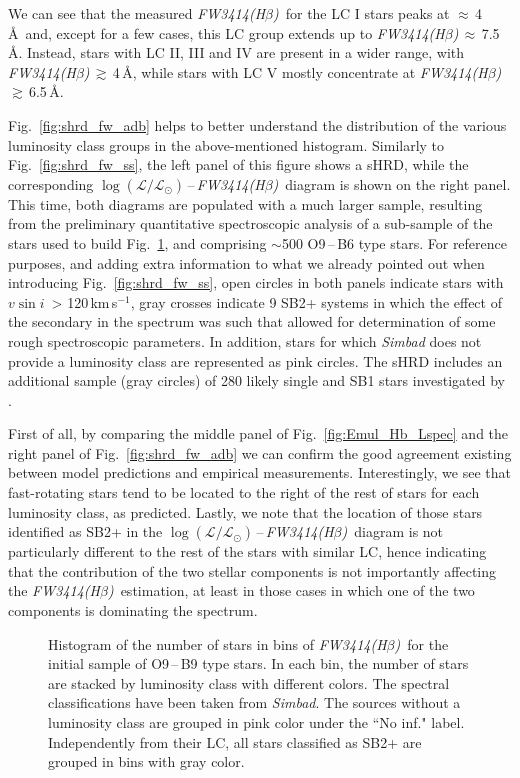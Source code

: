 \documentclass{aa}
\newcommand{\kms}{\mbox{km\,s$^{-1}$}}
\newcommand{\vsini}{\mbox{$v\sin i$}}
\newcommand{\logLs}{$\log (\mathcal{L}/\mathcal{L}_{\odot})$}
\newcommand{\gs}{\mbox{$\gtrsim$}}
\newcommand{\fwhb}{\textit{FW3414(H$\beta$)}}
\begin{document}
We can see that the measured \fwhb\ for the LC I stars peaks at $\approx$\,4\,\AA\ and, except for a few cases, this LC group extends up to \fwhb\,$\approx$\,7.5\,\AA. Instead, stars with LC II, III and IV are present in a wider range, with \fwhb\,\gs\,4\,\AA, while stars with LC V mostly concentrate at \fwhb\,\gs\,6.5\,\AA.

Fig.~\ref{fig:shrd_fw_adb} helps to better understand the distribution of the various luminosity class groups in the above-mentioned histogram. Similarly to Fig.~\ref{fig:shrd_fw_ss}, the left panel of this figure shows a sHRD, while the corresponding \logLs\,--\,\fwhb\ diagram is shown on the right panel. This time, both diagrams are populated with a much larger sample, resulting from the preliminary quantitative spectroscopic analysis of a sub-sample of the stars used to build Fig.~\ref{fig:hist_fw}, and comprising $\sim$500 O9\,--\,B6 type stars. For reference purposes, and adding extra information to what we already pointed out when introducing Fig.~\ref{fig:shrd_fw_ss}, open circles in both panels indicate stars with \vsini\ > 120\,\kms, gray crosses indicate 9 SB2+ systems in which the effect of the secondary in the spectrum was such that allowed for determination of some rough spectroscopic parameters. In addition, stars for which \textit{Simbad} does not provide a luminosity class are represented as pink circles. The sHRD includes an additional sample (gray circles) of 280 likely single and SB1 stars investigated by \citet{2020A&A...638A.157H}.

First of all, by comparing the middle panel of Fig.~\ref{fig:Emul_Hb_Lspec} and the right panel of Fig.~\ref{fig:shrd_fw_adb} we can confirm the good agreement existing between model predictions and empirical measurements. Interestingly, we see that fast-rotating stars tend to be located to the right of the rest of stars for each luminosity class, as predicted. Lastly, we note that the location of those stars identified as SB2+ in the \logLs\,--\,\fwhb\ diagram is not particularly different to the rest of the stars with similar LC, hence indicating that the contribution of the two stellar components is not importantly affecting the \fwhb\ estimation, at least in those cases in which one of the two components is dominating the spectrum.

\begin{figure}[!t]
\centering
{}
\caption{Histogram of the number of stars in bins of \fwhb\ for the initial sample of O9\,--\,B9 type stars. In each bin, the number of stars are stacked by luminosity class with different colors. The spectral classifications have been taken from \textit{Simbad}. The sources without a luminosity class are grouped in pink color under the ``No inf." label. Independently from their LC, all stars classified as SB2+ are grouped in bins with gray color.}
\label{fig:hist_fw}
\end{figure}
\end{document}
